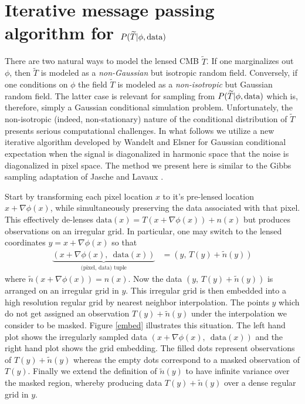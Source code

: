 \documentclass[noinfoline]{imsart}
\begin{document}
%
%
\section{Iterative message passing algorithm for $ P(\widetilde T |  \phi,\text{\rm data})$}
\label{Section: iterative message passing section}

There are two natural ways to model the lensed CMB $\widetilde T$. If one marginalizes out $\phi$, then $\widetilde T$ is modeled as a {\em non-Gaussian} but isotropic random field. Conversely, if one conditions on $\phi$ the field $\widetilde T$ is modeled as a {\em non-isotropic} but Gaussian random field. The latter case is relevant for sampling from $ P(\widetilde T |  \phi,\text{\rm data})$ which  is, therefore,  simply a Gaussian conditional simulation problem. Unfortunately, the non-isotropic (indeed, non-stationary) nature of the conditional distribution of $\widetilde T$ presents serious computational challenges. In what follows we utilize a new iterative algorithm developed by  Wandelt and Elsner \cite{elsner2013efficient} for Gaussian conditional expectation when the signal is diagonalized in harmonic space that the noise is diagonalized in pixel space. The method we present here is similar to the Gibbs sampling adaptation of Jasche and Lavaux \cite{jasche2014matrix}. 


Start by transforming each pixel location $x$ to it's pre-lensed location $x+\nabla \phi(x)$, while simultaneously preserving the data associated with that pixel. This  effectively de-lenses  $\text{data}(x)= T(x+\nabla \phi(x))+n(x)$ but produces observations on an irregular grid. In particular, one may switch to the lensed coordinates $y = x+\nabla\phi(x)$ so that
\begin{align}
\nonumber
\underbrace{(x +\nabla \phi(x),\, \text{ data}(x))}_{\text{(pixel, data) tuple}} & = (y, \, T(y) + \tilde n(y)) 
\end{align}
where $\tilde n(x+\nabla\phi(x))=n(x)$.  Now the data $(y, \, T(y) + \tilde n(y))$ is arranged on an irregular grid in $y$. This irregular grid is then embedded into a high resolution regular grid by nearest neighbor interpolation. The points $y$ which do not get assigned an observation $T(y)+\tilde n(y)$ under the interpolation we consider to be masked. 
Figure \ref{embed} illustrates this situation. The left hand plot shows the irregularly sampled data $(x +\nabla \phi(x),\, \text{ data}(x))$ and the right hand plot shows the grid embedding. The filled dots represent observations of $T(y) + \tilde n(y)$ whereas the empty dots correspond to a masked observation of $T(y)$. 
Finally we extend the definition of $\tilde n(y)$ to have infinite variance over the masked region, whereby producing data $T(y)+\tilde n(y)$ over a dense regular grid in $y$.
\end{document}
